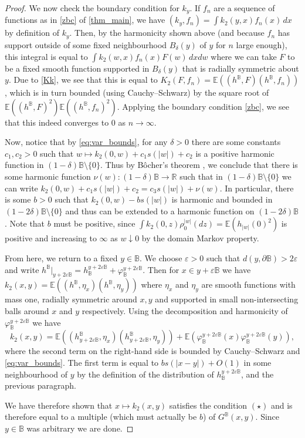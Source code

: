 \documentclass[10pt]{amsart}
\theoremstyle{definition}
\newcommand{\R}{\mathbb{R}}
\newcommand{\E}{\mathbb{E}}
\newcommand{\B}{\mathbb{B}}\let\D\B\let\Ub\B
\let\eps\varepsilon
\begin{document}
\begin{proof}
We now check the boundary condition for $k_y$. If $f_n$ are a sequence of functions as in \eqref{zbc} of \cref{thm_main}, we have $(k_y,f_n)=\int k_2(y,x)f_n(x) \, dx$ by definition of $k_y$. Then, by the harmonicity shown above (and because $f_n$ has support outside of some fixed neighbourhood $B_\delta(y)$ of $y$ for $n$ large enough), this integral is equal to $\int k_2(w,x) f_n(x) F(w) \, dx dw$ where we can take $F$ to be a fixed smooth function supported in $B_\delta(y)$ that is radially symmetric about $y$. Due to \eqref{Kk}, we see that this is equal to $K_2(F,f_n)=\E((h^{\B},F)(h^{\B},f_n))$, which is in turn bounded (using Cauchy--Schwarz) by the square root of $\E((h^{\B},F)^2)\E((h^\B,f_n)^2)$. Applying the boundary condition \eqref{zbc}, we see that this indeed converges to $0$ as $n\to \infty$.

Now, notice that by \eqref{eq:var_bounds}, for any $\delta > 0$ there are some constants $c_1, c_2 > 0$ such that $w\mapsto k_2(0,w) + c_1 s(|w|)+c_2$ is a positive harmonic function in \hbox{$(1-\delta)\B \setminus \{0\}$}. Thus by Bôcher's theorem \cite[Chap.\,III]{axlerharm}, we conclude that {there is some harmonic function $\nu(w): (1-\delta)\B \to \R$ such that in $(1-\delta)\B \setminus \{0\}$ we can write $k_2(0,w) + c_1 s(|w|)+c_2 = c_3 s(|w|) + \nu(w)$.} In particular, there is some $b > 0$ such that $k_2(0,w) - bs(|w|)$ is harmonic and bounded in $(1-2\delta)\B\setminus\{0\}$ and thus can be extended to a harmonic function on $(1-2\delta)\B$. Note that $b$ must be positive, since $\int k_2(0,z)\rho_0^{|w|}(dz)=\E(h_{|w|}(0)^2)$ is positive and increasing to $\infty$ as $w \downarrow 0$ by the domain Markov property.

From here, we return to a fixed $y\in \B$. We choose $\eps>0$ such that $d(y,\partial \B)>2\eps$ and write $h^\B|_{y+2\eps\B}=h_\B^{y+2\eps\B}+\varphi_\B^{y+2\eps\B}$. Then for $x\in y+\eps\B$ we have $k_2(x,y)=\E((h^\B,\eta_{x})(h^\B,\eta_{y}))$ where $\eta_x$ and $\eta_y$ are smooth functions with mass one, radially symmetric around $x,y$ and supported in small non-intersecting balls around $x$ and $y$ respectively. Using the decomposition and harmonicity of $\varphi_\B^{y+2\eps\B}$ we have
\[
k_2(x,y)=\E((h^\B_{y+2\eps\B},\eta_x)(h^\B_{y+2\eps\B},\eta_y))+\E(\varphi_\B^{y+2\eps\B}(x)\varphi_\B^{y+2\eps\B}(y)),
\]
where the second term on the right-hand side is bounded by Cauchy--Schwarz and \eqref{eq:var_bounds}. The first term is equal to $bs(|x-y|)+O(1)$ in some neighbourhood of $y$ by the definition of the distribution of $h^{y+2\eps\B}_\B$, and the previous paragraph.

We have therefore shown that $x\mapsto k_2(x,y)$ satisfies the condition $(\star)$ and is therefore equal to a multiple (which must actually be $b$) of $G^\B(x,y)$.
Since $y\in \B$ was arbitrary we are done.
\end{proof}
\end{document}
